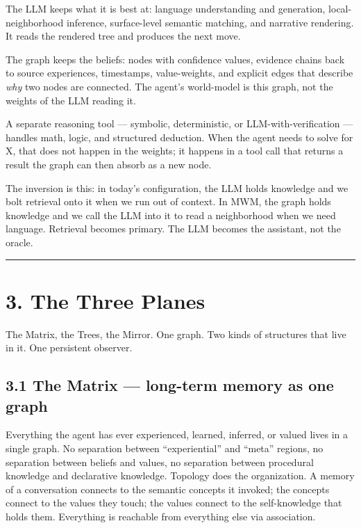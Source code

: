 \documentclass[12pt]{article}
\begin{document}
The LLM keeps what it is best at: language understanding and generation, local-neighborhood inference, surface-level semantic matching, and narrative rendering. It reads the rendered tree and produces the next move.

The graph keeps the beliefs: nodes with confidence values, evidence chains back to source experiences, timestamps, value-weights, and explicit edges that describe \emph{why} two nodes are connected. The agent's world-model is this graph, not the weights of the LLM reading it.

A separate reasoning tool --- symbolic, deterministic, or LLM-with-verification --- handles math, logic, and structured deduction. When the agent needs to solve for X, that does not happen in the weights; it happens in a tool call that returns a result the graph can then absorb as a new node.

The inversion is this: in today's configuration, the LLM holds knowledge and we bolt retrieval onto it when we run out of context. In MWM, the graph holds knowledge and we call the LLM into it to read a neighborhood when we need language. Retrieval becomes primary. The LLM becomes the assistant, not the oracle.

\begin{center}\rule{0.5\linewidth}{0.5pt}\end{center}

\section{3. The Three Planes}\label{the-three-planes}

The Matrix, the Trees, the Mirror. One graph. Two kinds of structures that live in it. One persistent observer.

\subsection{3.1 The Matrix --- long-term memory as one graph}\label{the-matrix-long-term-memory-as-one-graph}

Everything the agent has ever experienced, learned, inferred, or valued lives in a single graph. No separation between ``experiential'' and ``meta'' regions, no separation between beliefs and values, no separation between procedural knowledge and declarative knowledge. Topology does the organization. A memory of a conversation connects to the semantic concepts it invoked; the concepts connect to the values they touch; the values connect to the self-knowledge that holds them. Everything is reachable from everything else via association.
\end{document}
